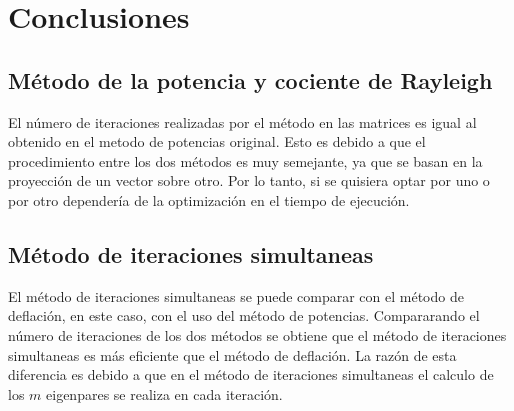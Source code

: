 \section{Conclusiones}

\subsection{Método de la potencia y cociente de Rayleigh}
El número de iteraciones realizadas por el método en las matrices es igual al obtenido en el metodo de potencias original. Esto es debido a que el procedimiento entre los dos métodos es muy semejante, ya que se basan en la proyección de un vector sobre otro. Por lo tanto, si se quisiera optar por uno o por otro dependería de la optimización en el tiempo de ejecución.

\subsection{Método de iteraciones simultaneas}

El método de iteraciones simultaneas se puede comparar con el método de deflación, en este caso, con el uso del método de potencias. Compararando el número de iteraciones de los dos métodos se obtiene que el método de iteraciones simultaneas es más eficiente que el método de deflación. La razón de esta diferencia es debido a que en el método de iteraciones simultaneas el calculo de los $m$ eigenpares se realiza en cada iteración.
